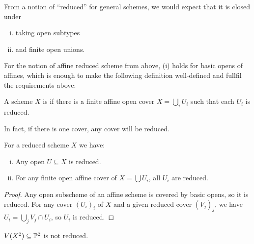 From a notion of ``reduced'' for general schemes, we would expect that it is closed under
\begin{enumerate}[(i)]
\item taking open subtypes
\item and finite open unions.
\end{enumerate}

For the notion of affine reduced scheme from above, (i) holds for basic opens of affines,
which is enough to make the following definition well-defined and fullfil the requirements above:

\begin{definition}
  A scheme $X$ is  if there is a finite affine open cover $X=\bigcup_i U_i$ such that each $U_i$ is reduced.
\end{definition}

In fact, if there is one cover, any cover will be reduced.

\begin{remark}
  For a reduced scheme $X$ we have:
  \begin{enumerate}[(i)]
  \item Any open $U\subseteq X$ is reduced.
  \item For any finite open affine cover of $X=\bigcup U_i$, all $U_i$ are reduced.
  \end{enumerate}
\end{remark}

\begin{proof}
  Any open subscheme of an affine scheme is covered by basic opens, so it is reduced.
  For any cover $(U_i)_i$ of $X$ and a given reduced cover $(V_j)_j$, we have $U_i=\bigcup_j V_j\cap U_i$, so $U_i$ is reduced.
\end{proof}

\begin{examples}
  $V(X^2)\subseteq \mathbb{P}^2$ is not reduced.
\end{examples}